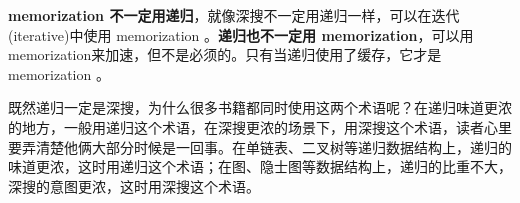 \textbf{memorization 不一定用递归}，就像深搜不一定用递归一样，可以在迭代(iterative)中使用 memorization 。\textbf{递归也不一定用 memorization}，可以用memorization来加速，但不是必须的。只有当递归使用了缓存，它才是 memorization 。

既然递归一定是深搜，为什么很多书籍都同时使用这两个术语呢？在递归味道更浓的地方，一般用递归这个术语，在深搜更浓的场景下，用深搜这个术语，读者心里要弄清楚他俩大部分时候是一回事。在单链表、二叉树等递归数据结构上，递归的味道更浓，这时用递归这个术语；在图、隐士图等数据结构上，递归的比重不大，深搜的意图更浓，这时用深搜这个术语。
